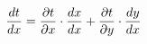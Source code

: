 \documentclass[preview]{standalone}
\begin{document}
\begin{align*}
\special{dvisvgm:raw <g id='unique000'>}\frac{dt}{dx} = \frac{\partial t}{\partial x} \cdot \frac{dx}{dx} + \frac{\partial t}{\partial y} \cdot \frac{dy}{dx}\special{dvisvgm:raw </g>}
\end{align*}
\end{document}
